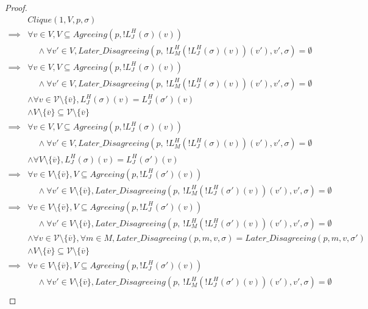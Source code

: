 \begin{proof}
\begin{align}
&Clique(1, V, p, \sigma)  \\
\implies& \forall v \in V, V \subseteq Agreeing(p, !L^H_J(\sigma)(v)) \\
        &~~~~~ \land \forall v' \in V,Later\_Disagreeing(p,~!L^H_M(!L^H_J(\sigma)(v))(v'), v', \sigma) = \emptyset \\
\implies& \forall v \in V, V \subseteq Agreeing(p, !L^H_J(\sigma)(v)) \\
        &~~~~~ \land \forall v' \in V,Later\_Disagreeing(p,~!L^H_M(!L^H_J(\sigma)(v))(v'), v', \sigma) = \emptyset \\
        &\land \forall v \in \mathcal{V} \setminus \{\overline{v}\}, L^H_J(\sigma)(v) = L^H_J(\sigma')(v) \\
        &\land V \setminus \{\overline{v}\} \subseteq \mathcal{V} \setminus \{\overline{v}\} \\
\implies& \forall v \in V, V \subseteq Agreeing(p, !L^H_J(\sigma)(v)) \\
        &~~~~~ \land \forall v' \in V,Later\_Disagreeing(p,~!L^H_M(!L^H_J(\sigma)(v))(v'), v', \sigma) = \emptyset \\
        &\land \forall V \setminus \{\overline{v}\}, L^H_J(\sigma)(v) = L^H_J(\sigma')(v) \\
\implies& \forall v \in V \setminus \{\overline{v}\}, V \subseteq Agreeing(p, !L^H_J(\sigma')(v)) \\
        &~~~~~ \land \forall v' \in V \setminus \{\overline{v}\},Later\_Disagreeing(p,~!L^H_M(!L^H_J(\sigma')(v))(v'), v', \sigma) = \emptyset \\
\implies& \forall v \in V \setminus \{\overline{v}\}, V \subseteq Agreeing(p, !L^H_J(\sigma')(v)) \\
        &~~~~~ \land \forall v' \in V \setminus \{\overline{v}\},Later\_Disagreeing(p,~!L^H_M(!L^H_J(\sigma')(v))(v'), v', \sigma) = \emptyset \\
        &\land \forall v \in \mathcal{V} \setminus \{\overline{v}\}, \forall m \in M, Later\_Disagreeing(p, m, v, \sigma) = Later\_Disagreeing(p, m, v, \sigma') \\
        &\land V \setminus \{\overline{v}\} \subseteq \mathcal{V} \setminus \{\overline{v}\} \\
\implies& \forall v \in V \setminus \{\overline{v}\}, V \subseteq Agreeing(p, !L^H_J(\sigma')(v)) \\
        &~~~~~ \land \forall v' \in V \setminus \{\overline{v}\},Later\_Disagreeing(p,~!L^H_M(!L^H_J(\sigma')(v))(v'), v', \sigma) = \emptyset \\

\end{align}
\end{proof}
